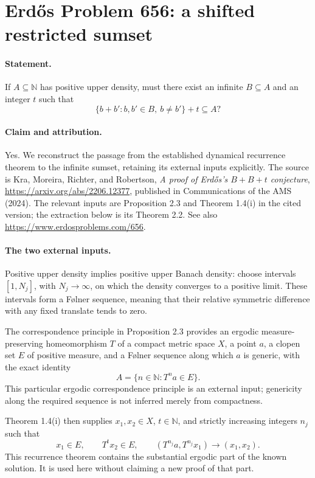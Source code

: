 \section*{Erd\H{o}s Problem 656: a shifted restricted sumset}

\paragraph{Statement.}
If \(A\subseteq\mathbb N\) has positive upper density, must there
exist an infinite \(B\subseteq A\) and an integer \(t\) such that
\[
 \{b+b':b,b'\in B,\ b\ne b'\}+t\subseteq A?
\]

\paragraph{Claim and attribution.}
Yes. We reconstruct the passage from the established dynamical
recurrence theorem to the infinite sumset, retaining its external
inputs explicitly. The source is Kra, Moreira, Richter, and Robertson,
\emph{A proof of Erd\H{o}s's \(B+B+t\) conjecture},
\url{https://arxiv.org/abs/2206.12377}, published in
Communications of the AMS (2024).
The relevant inputs are Proposition 2.3 and Theorem 1.4(i) in
the cited version; the extraction below is its Theorem 2.2.
See also \url{https://www.erdosproblems.com/656}.

\paragraph{The two external inputs.}
Positive upper density implies positive upper Banach density:
choose intervals \([1,N_j]\), with \(N_j\to\infty\), on which the
density converges to a positive limit. These intervals form a
F{\o}lner sequence, meaning that their relative symmetric
difference with any fixed translate tends to zero.

The correspondence principle in Proposition 2.3 provides an
ergodic measure-preserving homeomorphism \(T\) of a compact metric
space \(X\), a point \(a\), a clopen set \(E\) of positive measure,
and a F{\o}lner sequence along which \(a\) is generic, with the
exact identity
\[
 A=\{n\in\mathbb N:T^na\in E\}.
\]
This particular ergodic correspondence principle is an external
input; genericity along the required sequence is not inferred
merely from compactness.

Theorem 1.4(i) then supplies \(x_1,x_2\in X\), \(t\in\mathbb N\),
and strictly increasing integers \(n_j\) such that
\[
 x_1\in E,\qquad T^tx_2\in E,\qquad
 (T^{n_j}a,T^{n_j}x_1)\longrightarrow(x_1,x_2).
                                                               \tag{1}
\]
This recurrence theorem contains the substantial ergodic part
of the known solution. It is used here without claiming a
new proof of that part.


